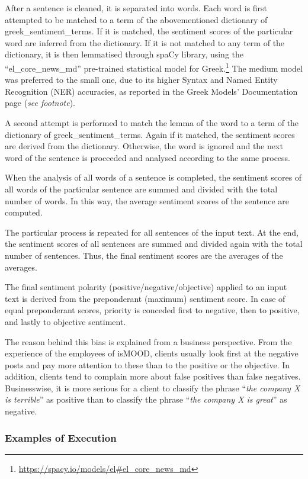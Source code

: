 After a sentence is cleaned, it is separated into words.
Each word is first attempted to be matched
to a term of the abovementioned dictionary of greek\_sentiment\_terms.
If it is matched,
the sentiment scores of the particular word are inferred from the dictionary.
If it is not matched to any term of the dictionary,
it is then lemmatised through spaCy library,
using the ``el\_core\_news\_md'' pre-trained statistical model for Greek.\footnote{\url {https://spacy.io/models/el#el_core_news_md}}
The medium model was preferred to the small one,
due to its higher Syntax and Named Entity Recognition (NER) accuracies,
as reported in the Greek Models' Documentation page (\textit {see footnote}).

A second attempt is performed to match the lemma of the word
to a term of the dictionary of greek\_sentiment\_terms.
Again if it matched,
the sentiment scores are derived from the dictionary.
Otherwise, the word is ignored and the next word of the sentence is proceeded
and analysed according to the same process.

When the analysis of all words of a sentence is completed,
the sentiment scores of all words of the particular sentence
are summed and divided with the total number of words.
In this way,
the average sentiment scores of the sentence are computed.

The particular process is repeated for all sentences of the input text.
At the end,
the sentiment scores of all sentences are summed
and divided again with the total number of sentences.
Thus, the final sentiment scores are the averages of the averages.

The final sentiment polarity (positive/negative/objective)
applied to an input text
is derived from the preponderant (maximum) sentiment score.
In case of equal preponderant scores,
priority is conceded first to negative,
then to positive, and lastly to objective sentiment.

The reason behind this bias is explained
from a business perspective.
From the experience of the employees of isMOOD,
clients usually look first at the negative posts
and pay more attention to these
than to the positive or the objective.
In addition, clients tend to complain more
about false positives than false negatives.
Businesswise, it is more serious for a client
to classify the phrase ``\emph{the company X is terrible}'' as positive
than to classify the phrase ``\emph{the company X is great}'' as negative.

\subsubsection{Examples of Execution}
\label{subsubsec:algexample}

